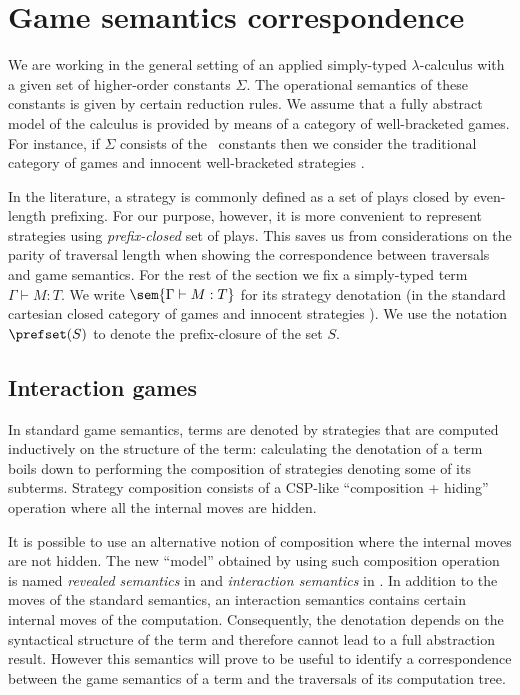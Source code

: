 




\section{Game semantics correspondence}
\label{sec:gamesemcorresp}

 We are working in the general setting of an applied
simply-typed $\lambda$-calculus with a given set of higher-order
constants $\Sigma$. The operational semantics of these constants is
given by certain reduction rules. We assume that a fully abstract
model of the calculus is provided by means of a category of
well-bracketed games. For instance, if $\Sigma$ consists
of the \pcf\ constants then we consider the traditional
category of games and innocent well-bracketed strategies
\cite{hylandong_pcf,abramsky94full}.


In the literature, a strategy is commonly defined as a set of plays closed by
even-length prefixing. For our purpose, however, it is more convenient to represent strategies using \emph{prefix-closed} set of plays. This saves us from considerations on the parity of traversal length when
showing the correspondence between traversals and game semantics.
 For the rest of the section we fix a simply-typed term $\Gamma \vdash M :T$. We write $\sem{\Gamma \vdash M : T}$ for its strategy denotation (in the standard cartesian closed category of games and innocent strategies \cite{abramsky94full, hylandong_pcf}). We use the notation $\prefset(S)$ to denote the prefix-closure of the set $S$.

\subsection{Interaction games}
\label{sec:interaction_semantics}

In standard game semantics, terms are denoted by strategies that are computed
inductively on the structure of the term: calculating the denotation of a term boils down to
performing the composition of strategies denoting some of its subterms. Strategy composition consists of a
CSP-like ``composition + hiding'' operation where all the internal moves are hidden.

It is possible to use an alternative notion of composition where the internal moves are not hidden.
The new ``model'' obtained by using such composition operation is named \emph{revealed
semantics} in \cite{willgreenlandthesis} and \emph{interaction semantics} in \cite{DBLP:conf/sas/DimovskiGL05}.
In addition to the moves of the standard semantics, an interaction
semantics contains certain internal moves of the computation.
Consequently, the denotation depends on the syntactical
structure of the term and therefore cannot lead to a full
abstraction result. However this semantics will prove to be useful
to identify a correspondence between the game semantics of a term
and the traversals of its computation tree.

